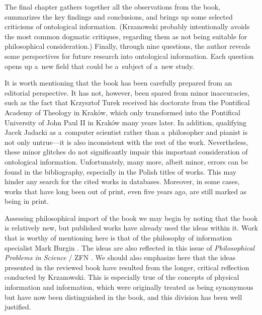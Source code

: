 The final chapter gathers together all the observations from the book, summarizes the key findings and conclusions, and brings up some selected criticisms of ontological information. (Krzanowski probably intentionally avoids the most common dogmatic critiques, regarding them as not being suitable for philosophical consideration.) Finally, through nine questions, the author reveals some perspectives for future research into ontological information. Each question opens up a~new field that could be a~subject of a~new study.

It is worth mentioning that the book has been carefully prepared from an editorial perspective. It has not, however, been spared from minor inaccuracies, such as the fact that Krzysztof Turek received his doctorate from the Pontifical Academy of Theology in Kraków, which only transformed into the Pontifical University of John Paul II in Kraków many years later. In addition, qualifying Jacek Jadacki as a~computer scientist
\parencite[][p.45]{krzanowski_ontological_2022} %
 rather than a~philosopher and pianist is not only untrue—it is also inconsistent with the rest of the work. Nevertheless, these minor glitches do not significantly impair this important consideration of ontological information. Unfortunately, many more, albeit minor, errors can be found in the bibliography, especially in the Polish titles of works. This may hinder any search for the cited works in databases. Moreover, in some cases, works that have long been out of print, even five years ago, are still marked as being in print.

Assessing philosophical import of the book we may begin by noting that the book is relatively new, but published works have already used the ideas within it. Work that is worthy of mentioning here is that of the philosophy of information specialist Mark Burgin
\parencite[][]{burgin_is_2022}. %
 The ideas are also reflected in this issue of \textit{Philosophical Problems in Science} / ZFN 
\parencite[][]{mscislawski_is_2022}. %
 We should also emphasize here that the ideas presented in the reviewed book have resulted from the longer, critical reflection conducted by Krzanowski. This is especially true of the concepts of physical information and information, which were originally treated as being synonymous but have now been distinguished in the book, and this division has been well justified.

